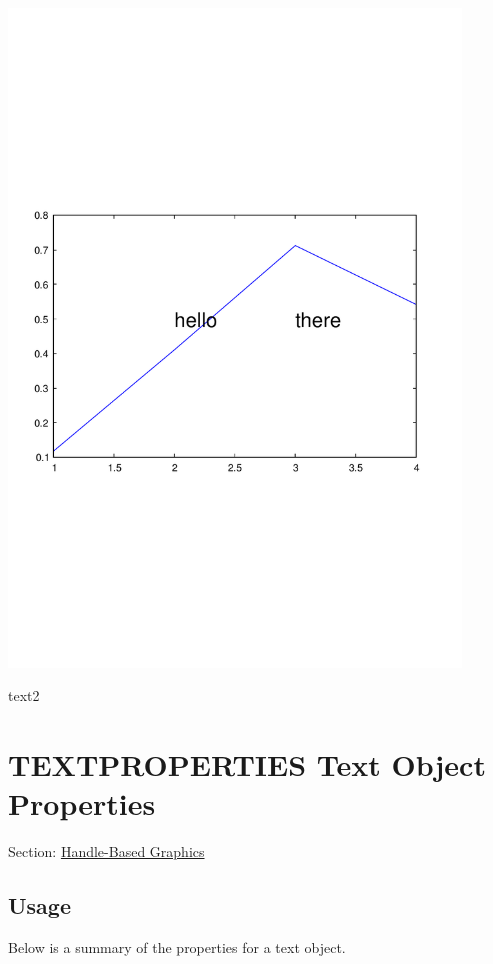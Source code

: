  
\begin{DoxyImage}
\includegraphics[width=12cm]{text2}
\caption{text2}
\end{DoxyImage}
 \hypertarget{handle_textproperties}{}\section{T\-E\-X\-T\-P\-R\-O\-P\-E\-R\-T\-I\-E\-S Text Object Properties}\label{handle_textproperties}
Section\-: \hyperlink{sec_handle}{Handle-\/\-Based Graphics} \hypertarget{vtkwidgets_vtkxyplotwidget_Usage}{}\subsection{Usage}\label{vtkwidgets_vtkxyplotwidget_Usage}
Below is a summary of the properties for a text object. 
